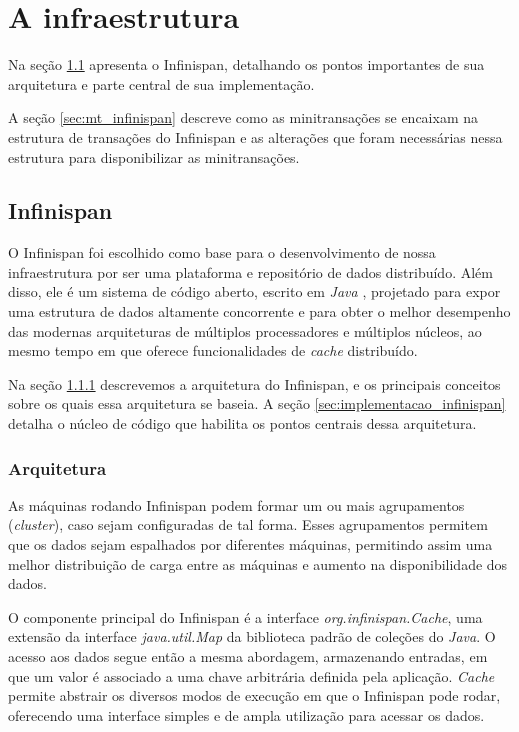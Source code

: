 \documentclass[11pt,twoside,a4paper]{book}
\begin{document}
\chapter{A infraestrutura}
\label{chap:implementacao}
Na seção \ref{sec:infinispan} apresenta o Infinispan, detalhando os pontos importantes de sua arquitetura e parte central de sua implementação. 

A seção \ref{sec:mt_infinispan} descreve como as minitransações se encaixam na estrutura de transações do Infinispan e as alterações que foram necessárias nessa estrutura para disponibilizar as minitransações.

\section{Infinispan}
\label{sec:infinispan}
O Infinispan foi escolhido como base para o desenvolvimento de nossa infraestrutura por ser uma plataforma e repositório de dados distribuído. Além disso, ele é um sistema de código aberto, escrito em \emph{Java} \cite{java}, projetado para expor uma estrutura de dados altamente concorrente e para obter o melhor desempenho das modernas arquiteturas de múltiplos processadores e múltiplos núcleos, ao mesmo tempo em que oferece funcionalidades de \emph{cache} distribuído.

Na seção \ref{sec:arquitetura_infinispan} descrevemos a arquitetura do Infinispan, e os principais conceitos sobre os quais essa arquitetura se baseia. A seção \ref{sec:implementacao_infinispan} detalha o núcleo de código que habilita os pontos centrais dessa arquitetura.

\subsection{Arquitetura}
\label{sec:arquitetura_infinispan}
As máquinas rodando Infinispan podem formar um ou mais agrupamentos (\emph{cluster}), caso sejam configuradas de tal forma. Esses agrupamentos permitem que os dados sejam espalhados por diferentes máquinas, permitindo assim uma melhor distribuição de carga entre as máquinas e aumento na disponibilidade dos dados.

O componente principal do Infinispan é a interface \emph{org.infinispan.Cache}, uma extensão da interface \emph{java.util.Map} da biblioteca padrão de coleções do \emph{Java}. O acesso aos dados segue então a mesma abordagem, armazenando entradas, em que um valor é associado a uma chave arbitrária definida pela aplicação. \emph{Cache} permite abstrair os diversos modos de execução em que o Infinispan pode rodar, oferecendo uma interface simples e de ampla utilização para acessar os dados.
\end{document}

